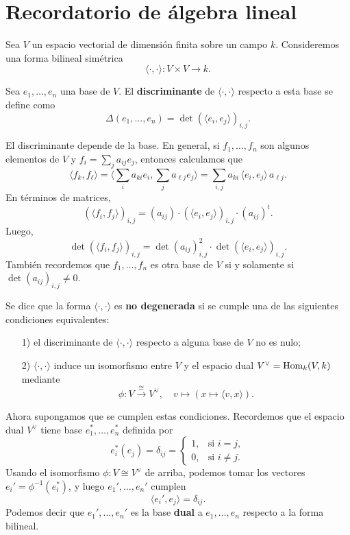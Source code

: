 
\section{Recordatorio de álgebra lineal}

Sea $V$ un espacio vectorial de dimensión finita sobre un campo $k$.
Consideremos una forma bilineal simétrica
$$\langle\cdot,\cdot\rangle\colon V\times V\to k.$$

Sea $e_1,\ldots,e_n$ una base de $V$. El \textbf{discriminante} de
$\langle\cdot,\cdot\rangle$ respecto a esta base se define como
$$\Delta (e_1,\ldots,e_n) = \det (\langle e_i,e_j\rangle)_{i,j}.$$

El discriminante depende de la base. En general, si $f_1,\ldots,f_n$ son algunos
elementos de $V$ y $f_i = \sum_j a_{ij} e_j$, entonces calculamos que
\[ \langle f_k,f_\ell\rangle =
   \langle \sum_i a_{ki} e_i, \sum_j a_{\ell j} e_j \rangle =
   \sum_{i,j} a_{ki} \, \langle e_i, e_j\rangle \, a_{\ell j}. \]
En términos de matrices,
\[ (\langle f_i,f_j\rangle)_{i,j} =
   (a_{ij}) \cdot (\langle e_i, e_j\rangle)_{i,j} \cdot (a_{ij})^t. \]
Luego,
\[ \det (\langle f_i,f_j\rangle)_{i,j} =
   \det (a_{ij})_{i,j}^2 \cdot \det (\langle e_i, e_j\rangle)_{i,j}. \]
También recordemos que $f_1,\ldots,f_n$ es otra base de $V$ si y solamente si
$\det (a_{ij})_{i,j} \ne 0$.

Se dice que la forma $\langle\cdot,\cdot\rangle$ es \textbf{no degenerada}
si se cumple una de las siguientes condiciones equivalentes:
\begin{enumerate}
\item[1)] el discriminante de $\langle\cdot,\cdot\rangle$ respecto a alguna
  base de $V$ no es nulo;
\item[2)] $\langle\cdot,\cdot\rangle$ induce un isomorfismo entre $V$ y el
  espacio dual $V^\vee = \operatorname{Hom}_k (V,k)$ mediante
  \[ \phi\colon V \xrightarrow{\cong} V^\vee, \quad
     v \mapsto (x \mapsto \langle v,x\rangle). \]
\end{enumerate}

Ahora supongamos que se cumplen estas condiciones. Recordemos que el espacio
dual $V^\vee$ tiene base $e_1^*, \ldots, e_n^*$ definida por
\[ e_i^* (e_j) = \delta_{ij} = \begin{cases}
  1, & \text{si } i = j,\\
  0, & \text{si } i \ne j.
\end{cases} \]
Usando el isomorfismo $\phi\colon V \cong V^\vee$ de arriba, podemos tomar
los vectores $e_i' = \phi^{-1} (e_i^*)$, y luego $e_1', \ldots, e_n'$ cumplen
$$\langle e_i', e_j\rangle = \delta_{ij}.$$
Podemos decir que $e_1', \ldots, e_n'$ es la base \textbf{dual} a
$e_1, \ldots, e_n$ respecto a la forma bilineal.


